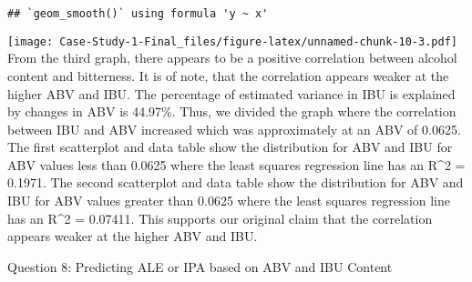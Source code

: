 \documentclass[
]{article}
\begin{document}
\begin{verbatim}
## `geom_smooth()` using formula 'y ~ x'
\end{verbatim}

\texttt{[image: Case-Study-1-Final\_files/figure-latex/unnamed-chunk-10-3.pdf]}
From the third graph, there appears to be a positive correlation between
alcohol content and bitterness. It is of note, that the correlation
appears weaker at the higher ABV and IBU. The percentage of estimated
variance in IBU is explained by changes in ABV is 44.97\%. Thus, we
divided the graph where the correlation between IBU and ABV increased
which was approximately at an ABV of 0.0625. The first scatterplot and
data table show the distribution for ABV and IBU for ABV values less
than 0.0625 where the least squares regression line has an R\^{}2 =
0.1971. The second scatterplot and data table show the distribution for
ABV and IBU for ABV values greater than 0.0625 where the least squares
regression line has an R\^{}2 = 0.07411. This supports our original
claim that the correlation appears weaker at the higher ABV and IBU.

Question 8: Predicting ALE or IPA based on ABV and IBU Content
\end{document}
